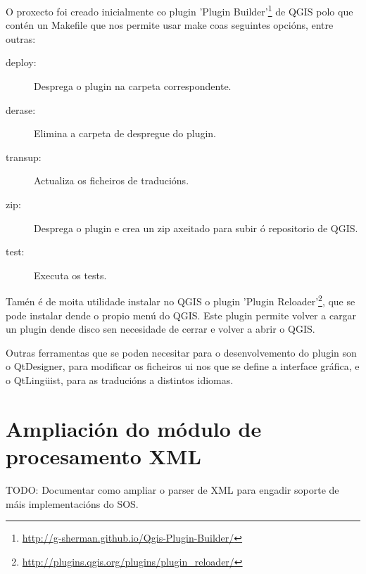 O proxecto foi creado inicialmente co plugin 'Plugin Builder'\footnote{\url{http://g-sherman.github.io/Qgis-Plugin-Builder/}} de QGIS polo que contén un Makefile que nos permite usar make coas seguintes opcións, entre outras:
\begin{description}
\item[deploy:] Desprega o plugin na carpeta correspondente.
\item[derase:] Elimina a carpeta de despregue do plugin.
\item[transup:] Actualiza os ficheiros de traducións.
\item[zip:] Desprega o plugin e crea un zip axeitado para subir ó repositorio de QGIS.
\item[test:] Executa os tests.
\end{description}

Tamén é de moita utilidade instalar no QGIS o plugin 'Plugin Reloader'\footnote{\url{http://plugins.qgis.org/plugins/plugin_reloader/}}, que se pode instalar dende o propio menú do QGIS. Este plugin permite volver a cargar un plugin dende disco sen necesidade de cerrar e volver a abrir o QGIS.

Outras ferramentas que se poden necesitar para o desenvolvemento do plugin son o QtDesigner, para modificar os ficheiros ui nos que se define a interface gráfica, e o QtLingüist, para as traducións a distintos idiomas.

\section{Ampliación do módulo de procesamento XML}
TODO: Documentar como ampliar o parser de XML para engadir soporte de máis implementacións do SOS.